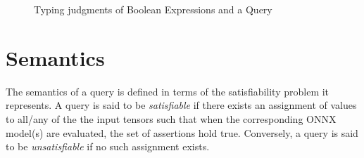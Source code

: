 \begin{figure}
    \begin{minipage}[t]{1\textwidth}
    \caption{Typing judgments of Boolean Expressions and a \vnnlib{} Query}
    \end{minipage}
\end{figure}

\section{Semantics}
\label{sec:semantics}

The semantics of a \vnnlib{} query is defined in terms of the satisfiability problem it represents. A query is said to be \textit{satisfiable} if there exists an assignment of values to all/any of the the input tensors such that when the corresponding ONNX model(s) are evaluated, the set of assertions hold true. Conversely, a query is said to be \textit{unsatisfiable} if no such assignment exists.

